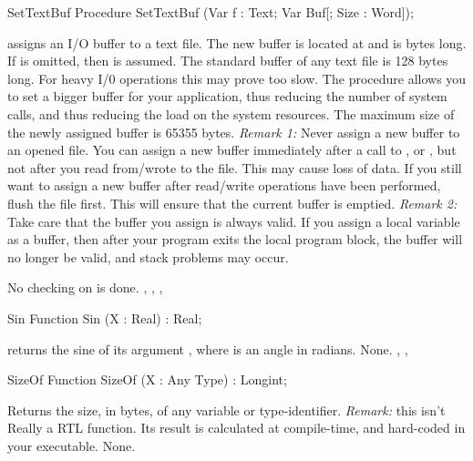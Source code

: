 \documentclass{report}
\begin{document}
\begin{procedure}{SetTextBuf}
\Declaration
Procedure SetTextBuf (Var f : Text; Var Buf[; Size : Word]);

\Description
{} assigns an I/O buffer to a text file. The new buffer is
located at  and is  bytes long. If  is omitted,
then  is assumed.
The standard buffer of any text file is 128 bytes long. For heavy I/0
operations this may prove too slow. The  procedure allows
you to set a bigger buffer for your application, thus reducing the number of
system calls, and thus reducing the load on the system resources.
The maximum size of the newly assigned buffer is 65355 bytes.
{\em Remark 1:} Never assign a new buffer to an opened file. You can assign a
new buffer immediately after a call to ,  or
, but not after you read from/wrote to the file. This may cause
loss of data. If you still want to assign a new buffer after read/write
operations have been performed, flush the file first. This will ensure that
the current buffer is emptied.
{\em Remark 2:} Take care that the buffer you assign is always valid. If you
assign a local variable as a buffer, then after your program exits the local
program block, the buffer will no longer be valid, and stack problems may
occur.

\Errors
No checking on  is done.
\SeeAlso
{}, , , 
\end{procedure}
\html{}
\begin{function}{Sin}
\Declaration
Function Sin (X : Real) : Real;

\Description
{} returns the sine of its argument , where  is an
angle in radians.
\Errors
None.
\SeeAlso
{}, , 
\end{function}
\html{}
\begin{function}{SizeOf}
\Declaration
Function SizeOf (X : Any Type) : Longint;

\Description
{} Returns the size, in bytes, of any variable or type-identifier.
 {\em Remark:} this isn't Really a RTL function. Its result is calculated at
compile-time, and hard-coded in your executable.
\Errors
None.
\SeeAlso
{}
\end{function}
\html{}
\end{document}

